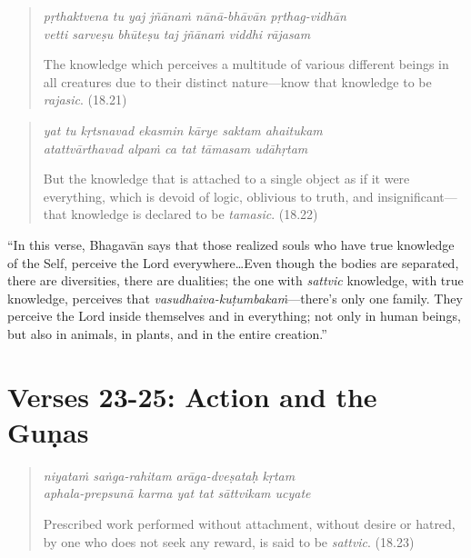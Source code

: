 \documentclass[12pt, twoside, openright]{memoir}
\begin{document}
\par
\begin{verse}
\textit{pṛthaktvena tu yaj jñānaṁ nānā-bhāvān pṛthag-vidhān} \\
\textit{vetti sarveṣu bhūteṣu taj jñānaṁ viddhi rājasam}

\noindent The knowledge which perceives a multitude of various different beings in all creatures due to their distinct nature---know that knowledge to be \textit{rajasic}. (18.21)
\end{verse}
\par



\par
\begin{verse}
\textit{yat tu kṛtsnavad ekasmin kārye saktam ahaitukam} \\
\textit{atattvārthavad alpaṁ ca tat tāmasam udāhṛtam}

\noindent But the knowledge that is attached to a single object as if it were everything, which is devoid of logic, oblivious to truth, and insignificant---that knowledge is declared to be \textit{tamasic}. (18.22)
\end{verse}
\par


\enquote{In this verse, Bhagavān says that those realized souls who have true knowledge of the Self, perceive the Lord everywhere\ldots Even though the bodies are separated, there are diversities, there are dualities; the one with \textit{sattvic} knowledge, with true knowledge, perceives that \textit{vasudhaiva-kuṭumbakaṁ}---there’s only one family. They perceive the Lord inside themselves and in everything; not only in human beings, but also in animals, in plants, and in the entire creation.}

\section{Verses 23-25: Action and the Guṇas}\label{sec-verses-23-25-action-and-the-gunas}


\par
\begin{verse}
\textit{niyataṁ saṅga-rahitam arāga-dveṣataḥ kṛtam} \\
\textit{aphala-prepsunā karma yat tat sāttvikam ucyate}

\noindent Prescribed work performed without attachment, without desire or hatred, by one who does not seek any reward, is said to be \textit{sattvic}. (18.23)
\end{verse}
\par
\end{document}
